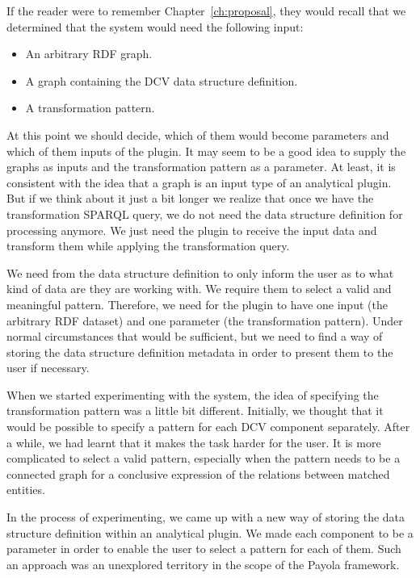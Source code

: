 If the reader were to remember Chapter~\ref{ch:proposal}, they would recall that we determined that 
the system would need the following input:
\begin{itemize}
  \item An arbitrary RDF graph.
  \item A graph containing the DCV data structure definition.
  \item A transformation pattern.
\end{itemize}

At this point we should decide, which of them would become parameters and which of 
them inputs of the plugin. It may seem to be a good idea to supply the 
graphs as inputs and the transformation pattern as a parameter. At least, it is 
consistent with the idea that a graph is an input type of an analytical plugin. 
But if we think about it just a bit longer we realize that once we have the 
transformation SPARQL query, we do not need the data structure definition for 
processing anymore. We just need the plugin to receive the input data and transform 
them while applying the transformation query.

We need from the data structure definition to only inform the user as to what kind of data are they 
are working 
with. We require them to select a valid and meaningful pattern. 
Therefore, we need for the plugin to have one input (the arbitrary RDF dataset) and 
one parameter (the transformation pattern). Under normal circumstances
that would be sufficient, but we 
need to find a way of storing the data structure definition metadata in order 
to present them to the user if necessary.

When we started experimenting with the system, the idea of specifying the 
transformation pattern was a little bit different. Initially, we thought that it 
would be possible to specify a pattern for each DCV component separately. After 
a while, we had learnt that it makes the task harder for the user. It is more complicated to select a 
valid pattern, especially when the pattern needs to be a connected graph for a conclusive expression
of the relations between matched entities.

In the process of experimenting, we came up with a new way of storing the 
data structure definition within an analytical plugin. We made each component to 
be a parameter in order to enable the user to select a pattern for each of 
them. Such an approach was an unexplored territory in the scope of the Payola framework.

